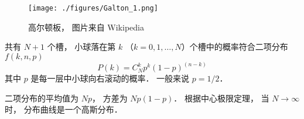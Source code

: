 
\begin{issues}
\issueDraft
\end{issues}


\begin{figure}[ht]
\centering
\texttt{[image: ./figures/Galton\_1.png]}
\caption{高尔顿板， 图片来自 Wikipedia} \label{Galton_fig1}
\end{figure}

共有 $N+1$ 个槽， 小球落在第 $k$ （$k = 0,1,\dots,N$）个槽中的概率符合二项分布 $f(k,n,p)$
\begin{equation}
P(k) = C_N^k p^k (1-p)^{(n-k)}
\end{equation}
其中 $p$ 是每一层中小球向右滚动的概率． 一般来说 $p = 1/2$．

二项分布的平均值为 $Np$， 方差为 $Np(1-p)$． 根据中心极限定理， 当 $N\to\infty$ 时， 分布曲线是一个高斯分布．
